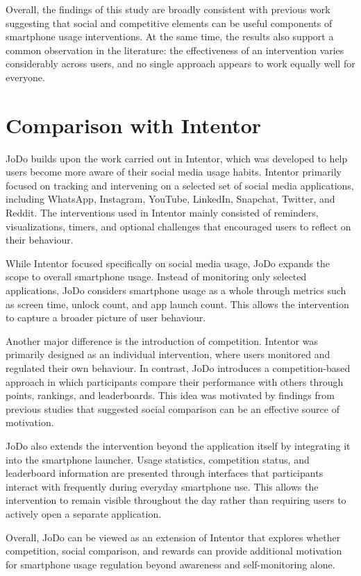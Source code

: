 \documentclass[11pt]{report}
\begin{document}
Overall, the findings of this study are broadly consistent with previous work suggesting 
that social and competitive elements can be useful components of smartphone usage 
interventions. At the same time, the results also support a common observation in the 
literature: the effectiveness of an intervention varies considerably across users, and 
no single approach appears to work equally well for everyone.

\section{Comparison with Intentor}

JoDo builds upon the work carried out in Intentor, which was developed to help users become more aware of their social media usage habits. Intentor primarily focused on tracking and intervening on a selected set of social media applications, including WhatsApp, Instagram, YouTube, LinkedIn, Snapchat, Twitter, and Reddit. The interventions used in Intentor mainly consisted of reminders, visualizations, timers, and optional challenges that encouraged users to reflect on their behaviour.

While Intentor focused specifically on social media usage, JoDo expands the scope to overall smartphone usage. Instead of monitoring only selected applications, JoDo considers smartphone usage as a whole through metrics such as screen time, unlock count, and app launch count. This allows the intervention to capture a broader picture of user behaviour.

Another major difference is the introduction of competition. Intentor was primarily designed as an individual intervention, where users monitored and regulated their own behaviour. In contrast, JoDo introduces a competition-based approach in which participants compare their performance with others through points, rankings, and leaderboards. This idea was motivated by findings from previous studies that suggested social comparison can be an effective source of motivation.

JoDo also extends the intervention beyond the application itself by integrating it into the smartphone launcher. Usage statistics, competition status, and leaderboard information are presented through interfaces that participants interact with frequently during everyday smartphone use. This allows the intervention to remain visible throughout the day rather than requiring users to actively open a separate application.

Overall, JoDo can be viewed as an extension of Intentor that explores whether competition, social comparison, and rewards can provide additional motivation for smartphone usage regulation beyond awareness and self-monitoring alone.
\end{document}
